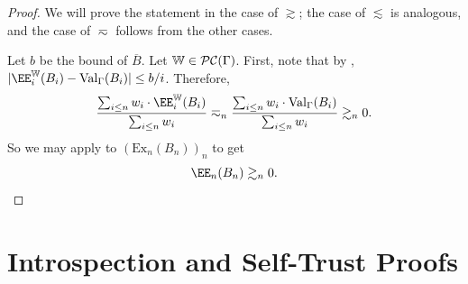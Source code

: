 \documentclass[authordate,onecolumn,noenvironments]{miri-tech-article}
\numberwithin{equation}{subsection}
\newcommand{\seq}[1]{{\overline{#1}}}
\newcommand{\nn}{n}
\newcommand{\fuz}{w}
\newcommand{\affluv}{B} %
\newcommand{\alta}{\mathrm{Ex}} %
\newcommand{\cworlds}{\mathcal{P\-C}} %
\newcommand{\World}{\mathbb{W}}
\newcommand{\Theory}{\Gamma}
\newcommand{\thmval}[1][\Theory]{\operatorname{Val}_{#1}\-} %
\begin{document}
\begin{proof}
  We will prove the statement in the case of $\gtrsim$; the case of $\lesssim$ is analogous, and the case of $\eqsim$ follows from
  the other cases.  
  
  Let $b$ be the bound of $\seq\affluv$.  Let $\World \in \cworlds(\Theory)$.
  First, note that by ,
  $|\EE_i^\World(\affluv_i) - \thmval(\affluv_i)| \leq b/i$.
  Therefore,
  \[
    \frac{\sum_{i \leq n} \fuz_i \cdot \EE_i^\World(\affluv_i)}{\sum_{i \leq n} \fuz_i} \eqsim_n \frac{ \sum_{i \leq n} \fuz_i \cdot \thmval(\affluv_i)}{\sum_{i \leq n} \fuz_i} \gtrsim_n 0.
  \]
  So we may apply  to $(\alta_n(\affluv_n))_n$ to get
  \[
    \EE_n(\affluv_\nn) \gtrsim_n 0.
  \]
\end{proof}



\section{Introspection and Self-Trust Proofs}\label{app:introspectiontrust}
\end{document}
